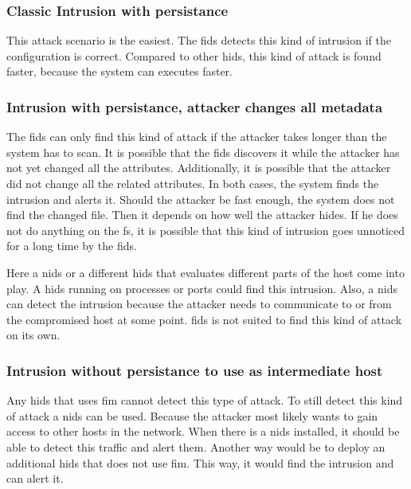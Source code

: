 \subsubsection{Classic Intrusion with persistance}
\label{sec:defense:classic}

This attack scenario is the easiest. The \gls{fids} detects this kind of intrusion if the configuration is correct. Compared to other \gls{hids}, this kind of attack is found faster, because the system can executes faster. 

\subsubsection{Intrusion with persistance, attacker changes all metadata}
\label{sec:defense:changeattr}

The \gls{fids} can only find this kind of attack if the attacker takes longer than the system has to scan. It is possible that the \gls{fids} discovers it while the attacker has not yet changed all the attributes. Additionally, it is possible that the attacker did not change all the related attributes. In both cases, the system finds the intrusion and alerts it. Should the attacker be fast enough, the system does not find the changed file. Then it depends on how well the attacker hides. If he does not do anything on the \gls{fs}, it is possible that this kind of intrusion goes unnoticed for a long time by the \gls{fids}. 

Here a \gls{nids} or a different \gls{hids} that evaluates different parts of the host come into play. A \gls{hids} running on processes or ports could find this intrusion. Also, a \gls{nids} can detect the intrusion because the attacker needs to communicate to or from the compromised host at some point. \gls{fids} is not suited to find this kind of attack on its own.

\subsubsection{Intrusion without persistance to use as intermediate host}
\label{sec:defense:nopersistanceintermediatehost}

Any \gls{hids} that uses \gls{fim} cannot detect this type of attack. To still detect this kind of attack a \gls{nids} can be used. Because the attacker most likely wants to gain access to other hosts in the network. When there is a \gls{nids} installed, it should be able to detect this traffic and alert them. Another way would be to deploy an additional \gls{hids} that does not use \gls{fim}. This way, it would find the intrusion and can alert it.


